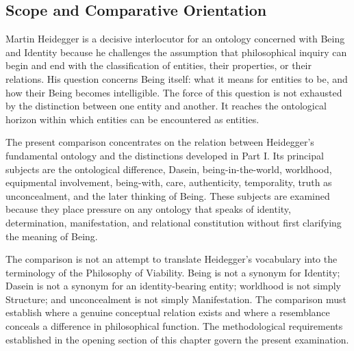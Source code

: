 
\subsection{Scope and Comparative Orientation}
\label{subsec:ch08-heidegger-scope}

\label{para:VS.B01.P01.C08.S11.SS01.P001}

Martin Heidegger is a decisive interlocutor for an ontology
concerned with Being and Identity because he challenges the
assumption that philosophical inquiry can begin and end with
the classification of entities, their properties, or their
relations. His question concerns Being itself: what it means
for entities to be, and how their Being becomes intelligible.
The force of this question is not exhausted by the distinction
between one entity and another. It reaches the ontological
horizon within which entities can be encountered as entities.

\label{para:VS.B01.P01.C08.S11.SS01.P002}

The present comparison concentrates on the relation between
Heidegger's fundamental ontology and the distinctions
developed in Part I. Its principal subjects are the
ontological difference, Dasein, being-in-the-world, worldhood,
equipmental involvement, being-with, care, authenticity,
temporality, truth as unconcealment, and the later thinking
of Being. These subjects are examined because they place
pressure on any ontology that speaks of identity,
determination, manifestation, and relational constitution
without first clarifying the meaning of Being.

\label{para:VS.B01.P01.C08.S11.SS01.P003}

The comparison is not an attempt to translate Heidegger's
vocabulary into the terminology of the Philosophy of Viability.
Being is not a synonym for Identity; Dasein is not a synonym
for an identity-bearing entity; worldhood is not simply
Structure; and unconcealment is not simply Manifestation.
The comparison must establish where a genuine conceptual
relation exists and where a resemblance conceals a difference
in philosophical function. The methodological requirements
established in the opening section of this chapter govern
the present examination.

